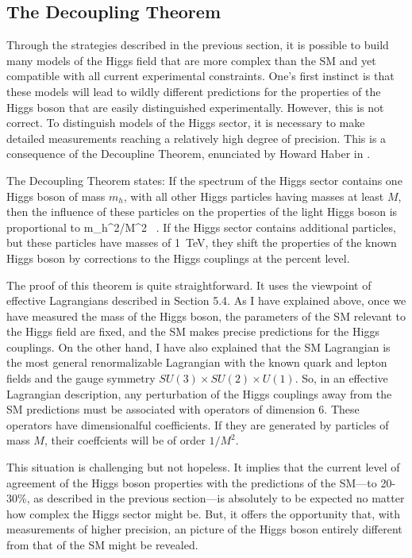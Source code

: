 \documentclass[12pt]{article}
\begin{document}
\subsection{The Decoupling Theorem}

Through the strategies described in the previous section, it is
possible to build many models of the Higgs field that are more complex
than the SM and yet compatible with all current
experimental constraints.  One's first instinct is that these models
will lead to wildly different predictions for the properties of the
Higgs boson that are easily distinguished experimentally.   However,
this is not correct.   To distinguish models of the Higgs sector, it
is necessary to make detailed measurements reaching a relatively high
degree of precision.   This is a consequence of the Decoupline
Theorem, enunciated by Howard Haber in \cite{HaberDec}.

The Decoupling Theorem states: If the spectrum of the Higgs sector
contains one Higgs boson of mass $m_h$, with all other Higgs particles
having masses at least $M$, then the influence of these particles on
the properties of the light Higgs boson is proportional to 
\beq
                 m_h^2/M^2  \ .
\eeqn
If the Higgs sector contains additional particles, but these particles
have masses of 1~TeV, they shift the properties of the known Higgs
boson by corrections to the Higgs couplings at the percent level.

The proof of this theorem is quite straightforward.   It uses the
viewpoint of effective Lagrangians described in Section 5.4.    As I
have explained above, once we have measured the mass of the Higgs
boson, the parameters of  the SM relevant to the Higgs
field are fixed, and the SM makes precise predictions for
the Higgs couplings.   On the other hand, I have also explained that
the SM Lagrangian is the most general renormalizable
Lagrangian
with the known quark and lepton fields and the gauge symmetry 
$SU(3)\times SU(2)\times U(1)$.    So, in an effective Lagrangian
description, any perturbation of the Higgs couplings away from the 
SM predictions must be associated with operators of
dimension 6.  These operators have dimensionalful coefficients.  If
they are generated by particles of mass $M$, their coeffcients will be
of order $1/M^2$. 

This situation is challenging but not hopeless.   It implies that the 
current level of agreement of the Higgs boson properties with the predictions
of the SM---to 20-30\%, as described in the previous
section---is absolutely to be expected no matter how complex the Higgs
sector might be.  But, it offers the opportunity that, with
measurements of higher precision, an picture of the
Higgs boson entirely different from that of the SM might be revealed.
\end{document}

